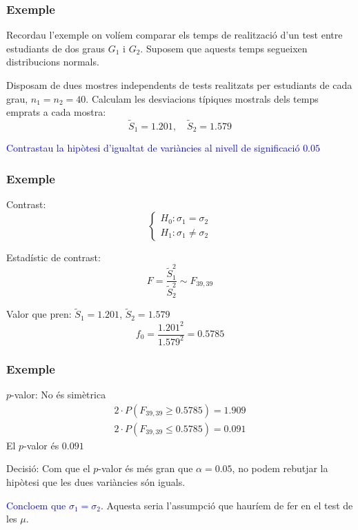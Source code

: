 \documentclass[12pt,t]{beamer}\usepackage[]{graphicx}\usepackage[]{color}
\newcommand{\blue}[1]{\textcolor{blue}{#1}}
\renewcommand{\emph}[1]{{\color{red}#1}}
\renewcommand{\leq}{\leqslant}
\renewcommand{\geq}{\geqslant}
\theoremstyle{plain}
\theoremstyle{definition}
\begin{document}
\begin{frame}
\frametitle{Exemple}
Recordau l'exemple on volíem comparar els temps de realització d'un test 
entre estudiants de dos graus $G_1$ i $G_2$. \emph{Suposem que aquests temps segueixen distribucions normals}.
\medskip

Disposam de dues mostres independents de tests realitzats per estudiants de cada grau, $n_1=n_2=40$. Calculam les desviacions típiques
mostrals dels temps emprats a cada mostra:
$$
\widetilde{S}_1=1.201,\quad \widetilde{S}_2=1.579
$$


\blue{Contrastau la hipòtesi d'igualtat de variàncies al
nivell de significació $0.05$} 

\end{frame}


\begin{frame}
\frametitle{Exemple}


\emph{Contrast}:
$$
\left\{\begin{array}{l}
H_0:\sigma_1=\sigma_2\\
H_1:\sigma_1\neq \sigma_2
\end{array}\right.
$$

\emph{Estadístic de contrast}: 
$$
F=\frac{\widetilde{S}_1^2}{\widetilde{S}_2^2}\sim F_{39,39}
$$
\medskip

\emph{Valor que pren}: $\widetilde{S}_1=1.201$, $\widetilde{S}_2=1.579$
$$
f_0=\frac{1.201^2}{1.579^2}=0.5785
$$

\end{frame}

\begin{frame}
\frametitle{Exemple}

\emph{$p$-valor}: No és simètrica
$$
\begin{array}{l}
2\cdot P(F_{39,39}\geq 0.5785)= 1.909\\
2\cdot P(F_{39,39}\leq 0.5785)=0.091
\end{array}
$$
El $p$-valor és $0.091$
\medskip

\emph{Decisió}: Com que el $p$-valor és més gran que $\alpha=0.05$, no podem rebutjar la hipòtesi que les dues variàncies són iguals. \medskip

\blue{Concloem que $\sigma_1= \sigma_2$}. Aquesta seria l'assumpció que hauríem de fer en el test de les $\mu$.

\end{frame}
%
%
%
%
\end{document}
